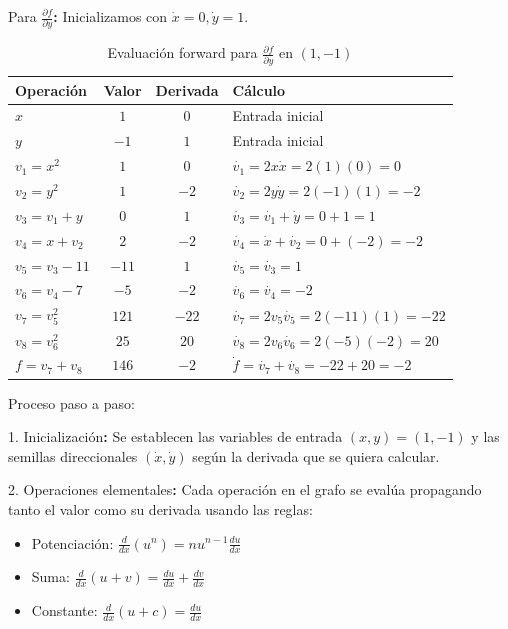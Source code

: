 \documentclass{article}
\begin{document}
Para\textbf{ $\frac{\partial f}{\partial y}$:}
Inicializamos con $\dot{x} = 0, \dot{y} = 1$.

\begin{table}[h]
\centering
\begin{tabular}{|l|c|c|l|}
\hline
\textbf{Operación} & \textbf{Valor} & \textbf{Derivada} & \textbf{Cálculo} \\
\hline
$x$ & $1$ & $0$ & Entrada inicial \\
$y$ & $-1$ & $1$ & Entrada inicial \\
\hline
$v_1 = x^2$ & $1$ & $0$ & $\dot{v_1} = 2x\dot{x} = 2(1)(0) = 0$ \\
$v_2 = y^2$ & $1$ & $-2$ & $\dot{v_2} = 2y\dot{y} = 2(-1)(1) = -2$ \\
\hline
$v_3 = v_1 + y$ & $0$ & $1$ & $\dot{v_3} = \dot{v_1} + \dot{y} = 0 + 1 = 1$ \\
$v_4 = x + v_2$ & $2$ & $-2$ & $\dot{v_4} = \dot{x} + \dot{v_2} = 0 + (-2) = -2$ \\
\hline
$v_5 = v_3 - 11$ & $-11$ & $1$ & $\dot{v_5} = \dot{v_3} = 1$ \\
$v_6 = v_4 - 7$ & $-5$ & $-2$ & $\dot{v_6} = \dot{v_4} = -2$ \\
\hline
$v_7 = v_5^2$ & $121$ & $-22$ & $\dot{v_7} = 2v_5\dot{v_5} = 2(-11)(1) = -22$ \\
$v_8 = v_6^2$ & $25$ & $20$ & $\dot{v_8} = 2v_6\dot{v_6} = 2(-5)(-2) = 20$ \\
\hline
$f = v_7 + v_8$ & $146$ & $-2$ & $\dot{f} = \dot{v_7} + \dot{v_8} = -22 + 20 = -2$ \\
\hline
\end{tabular}
\caption{Evaluación forward para $\frac{\partial f}{\partial y}$ en $(1,-1)$}
\end{table}

Proceso paso a paso:

1. Inicialización\textbf{:} Se establecen las variables de entrada $(x,y) = (1,-1)$ y las semillas direccionales $(\dot{x}, \dot{y})$ según la derivada que se quiera calcular.

2. Operaciones\textbf{ }elementales\textbf{:} Cada operación en el grafo se evalúa propagando tanto el valor como su derivada usando las reglas:
   \begin{itemize}
       \item Potenciación: $\frac{d}{dx}(u^n) = nu^{n-1}\frac{du}{dx}$
       \item Suma: $\frac{d}{dx}(u + v) = \frac{du}{dx} + \frac{dv}{dx}$
       \item Constante: $\frac{d}{dx}(u + c) = \frac{du}{dx}$
   \end{itemize}
\end{document}
